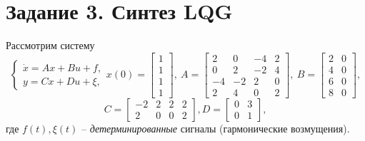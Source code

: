 \documentclass[a4paper, 12pt]{article}
\begin{document}
    \section{Задание 3. Синтез LQG}
    Рассмотрим систему
    $$
    \begin{cases}
        \dot{x}=Ax+Bu+f,\\
        y=Cx+Du+\xi,
    \end{cases} x(0)=\begin{bmatrix}
        1\\1\\1\\1
    \end{bmatrix},\ A=\begin{bmatrix}
        2 &0 &-4 &2\\
        0 &2 &-2 &4\\
        -4 &-2 &2 &0\\
        2 &4 &0 &2
    \end{bmatrix},\ B=\begin{bmatrix}
        2 &0\\
        4 &0\\
        6 &0\\
        8 &0
    \end{bmatrix},
    $$
    $$
    C=\begin{bmatrix}
        -2 &2 &2 &2\\
        2 &0 &0 &2
    \end{bmatrix}, D=\begin{bmatrix}
        0 &3\\
        0 &1
    \end{bmatrix},
    $$
    где $f(t),\xi(t)$ -- \textit{детерминированные} сигналы (гармонические возмущения).

    
\end{document}
